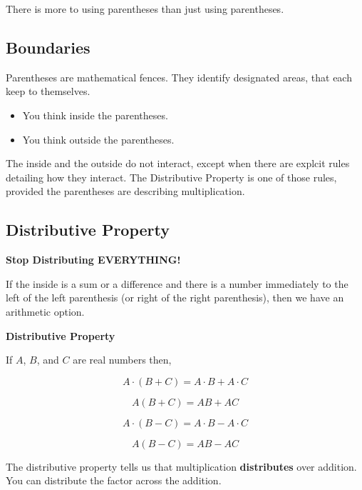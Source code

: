 \documentclass{ximera}
\begin{document}
There is more to using parentheses than just using parentheses. 



\subsection*{Boundaries}


Parentheses are mathematical fences.  They identify designated areas, that each keep to themselves. 

\begin{itemize}
\item You think inside the parentheses. 
\item You think outside the parentheses. 
\end{itemize}



The inside and the outside do not interact, except when there are explcit rules detailing how they interact.  The Distributive Property is one of those rules, provided the parentheses are describing multiplication. 










\subsection*{Distributive Property} 

\textbf{\textcolor{red!70!black}{Stop Distributing EVERYTHING!}}


If the inside is a sum or a difference and there is a number immediately to the left of the left parenthesis (or right of the right parenthesis), then we have an arithmetic option.


\begin{template}  \textbf{\textcolor{purple!65!blue}{Distributive Property}} 


If $A$, $B$, and $C$ are real numbers then,

\[
A \cdot (B + C) = A \cdot B + A \cdot C
\]


\[
A (B + C) = A  B + A  C
\]


\[
A \cdot (B - C) = A \cdot B - A \cdot C
\]


\[
A (B - C) = A  B - A  C
\]




\end{template}


The distributive property tells us that multiplication \textbf{distributes} over addition.  You can distribute the factor across the addition. 
\end{document}
